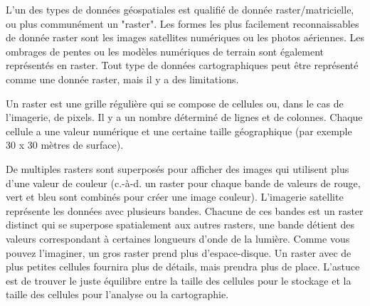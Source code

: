 L'un des types de données géospatiales est qualifié de donnée raster/matricielle, ou plus communément un "raster". Les formes les plus facilement reconnaissables de donnée raster sont les images satellites numériques ou les photos aériennes. Les ombrages de pentes ou les modèles numériques de terrain sont également représentés en raster. Tout type de données cartographiques peut être représenté comme une donnée raster, mais il y a des limitations.

Un raster est une grille régulière qui se compose de cellules ou, dans le cas de l'imagerie, de pixels. Il y a un nombre déterminé de lignes et de colonnes. Chaque cellule a une valeur numérique et une certaine taille géographique (par exemple 30 x 30 mètres de surface).

De multiples rasters sont superposés pour afficher des images qui utilisent plus d'une valeur de couleur (c.-à-d. un raster pour chaque bande de valeurs de rouge, vert et bleu sont combinés pour créer une image couleur). L'imagerie satellite représente les données avec plusieurs bandes. Chacune de ces bandes est un raster distinct qui se superpose spatialement aux autres rasters, une bande détient des valeurs correspondant à certaines longueurs d'onde de la lumière. Comme vous pouvez l'imaginer, un gros raster prend plus d'espace-disque. Un raster avec de plus petites cellules fournira plus de détails, mais prendra plus de place. L'astuce est de trouver le juste équilibre entre la taille des cellules pour le stockage et la taille des cellules pour l'analyse ou la cartographie.

%
%
%
%

